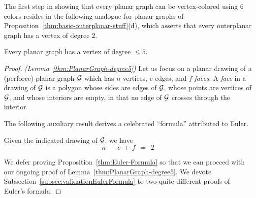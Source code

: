 The first step in showing that every planar graph can be vertex-colored using
$6$ colors resides in the following analogue for planar graphs of
Proposition~\ref{thm:basic-outerplanar-stuff}(d), which asserts that
every outerplanar graph has a vertex of degree $2$.

\begin{lemma}
\label{thm:PlanarGraph-degree5}
Every planar graph has a vertex of degree $\leq 5$.
\end{lemma}

\begin{proof} {\em (Lemma~\ref{thm:PlanarGraph-degree5})}
Let us focus on a planar drawing of a (perforce) planar graph $\mbox{$\cal G$}$
which has $n$ vertices, $e$ edges, and $f$ {\it faces}.  A {\it face}
in a drawing of $\mbox{$\cal G$}$ is a polygon whose sides are edges of
$\mbox{$\cal G$}$, whose points are vertices of $\mbox{$\cal G$}$, and whose interiors are empty,
in that no edge of $\mbox{$\cal G$}$ crosses through the interior.

\bigskip

\noindent {}
\bigskip

The following auxiliary result derives a celebrated ``formula'' attributed to Euler.   

\begin{prop} 
\label{thm:Euler-Formula}
Given the indicated drawing of $\mbox{$\cal G$}$, we have
\begin{equation}
\label{eqn:Eulers-formula}
n \ - \ e \ + \ f \ \ = \ \ 2
\end{equation}
\end{prop}

\medskip

We defer proving Proposition~\ref{thm:Euler-Formula} so that we can proceed with our
ongoing proof of Lemma~\ref{thm:PlanarGraph-degree5}.  
We devote Subsection~\ref{subsec:validationEulerFormula} to 
two quite different proofs of Euler's formula.


\end{proof}
